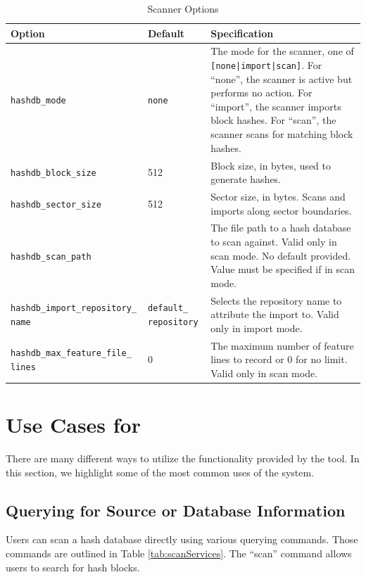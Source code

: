 \documentclass[11pt,fleqn]{article} %
\begin{document}
\begin{table}[!ht]

\centering
\caption{\bulk \hdb Scanner Options}
\label{tab:hashdb_be_usage}
\begin{tabular}{|p{5 cm}|p{2.0 cm}|p{6.5 cm}|}
\hline \hline
\textbf{Option} & \textbf{Default} & \textbf{Specification} \\
\hline
\verb+hashdb_mode+ & \verb+none+ & The mode for the scanner, one of \verb+[none|import|scan]+. For ``none'', the scanner is active but performs no action. For ``import'', the scanner imports block hashes. For ``scan'', the scanner scans for matching block hashes.\\
\hline
\verb+hashdb_block_size+ &512 & Block size, in bytes, used to generate hashes.\\
\hline
\verb+hashdb_sector_size+ &512 & Sector size, in bytes.  Scans and imports along sector boundaries.\\
\hline
\verb+hashdb_scan_path+ & & The file path to a hash database to scan against.  Valid only in scan mode. No default provided. Value must be specified if in scan mode.\\
\hline
\verb+hashdb_import_repository_+ \verb+name+ & \verb+default_+ \verb+repository+ &Selects the repository name to attribute the import to.  Valid only in import mode.\\
\hline
\verb+hashdb_max_feature_file_+ \verb+lines+ & 0 &The maximum number of feature lines to record or 0 for no limit.  Valid only in scan mode.\\
\hline
\end{tabular}
\end{table}

\section{Use Cases for \hdb}
\label{UseCases}
There are many different ways to utilize the functionality provided by the \hdb tool. In this section, we highlight some of the most common uses of the system.

\subsection{Querying for Source or Database Information}
 Users can scan a hash database directly using various querying commands. Those commands are outlined in Table \ref{tab:scanServices}.  The ``scan'' command allows users to search for hash blocks.\\
\end{document}
